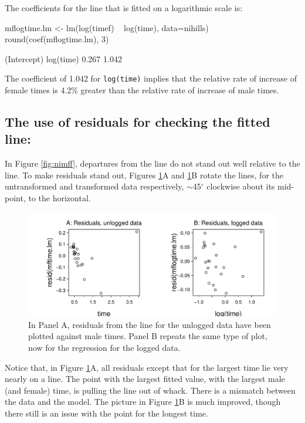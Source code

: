 \documentclass{tufte-book}\usepackage[]{graphicx}\usepackage[]{color}
\newcommand{\txtt}[1]{\texttt{#1}}
\begin{document}
The coefficients for the line that is fitted on a logarithmic
scale is:
\begin{Schunk}
\begin{Sinput}
mflogtime.lm <- lm(log(timef) ~ log(time),
                   data=nihills)
round(coef(mflogtime.lm), 3)
\end{Sinput}
\begin{Soutput}
(Intercept)   log(time) 
      0.267       1.042 
\end{Soutput}
\end{Schunk}
The coefficient of 1.042 for \txtt{log(time)} implies that the
relative rate of increase of female times is 4.2\% greater than the
relative rate of increase of male times.

\subsection*{The use of residuals for checking the fitted line:}
In Figure \ref{fig:nimff}, departures from the line do not stand out
well relative to the line.  To make residuals stand out, Figures
\ref{fig:to-horiz}A and \ref{fig:to-horiz}B rotate the lines, for the
untransformed and transformed data respectively, $\sim$45$^{\circ}$
clockwise about its mid-point, to the horizontal.

\begin{figure}
\begin{Schunk}


\centerline{\includegraphics[width=\textwidth]{figs/8-tohoriz-mf-1} }

\end{Schunk}
\caption{In Panel A, residuals from the line for the unlogged data
  have been plotted against male times.  Panel B repeats the same
  type of plot, now for the regression for the logged data.\label{fig:to-horiz}}
\end{figure}

\noindent
Notice that, in Figure \ref{fig:to-horiz}A, all residuals except that
for the largest time lie very nearly on a line.  The point with the
largest fitted value, with the largest male (and female) time, is
pulling the line out of whack.  There is a mismatch between the data
and the model.  The picture in Figure \ref{fig:to-horiz}B is much
improved, though there still is an issue with the point for the
longest time.
\end{document}
